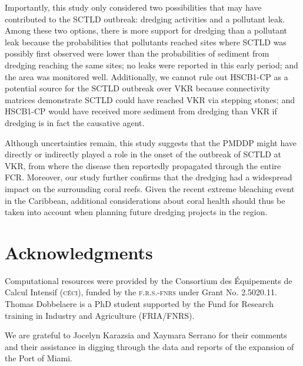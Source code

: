 \documentclass[preprint,12pt,authoryear]{elsarticle}
\begin{document}
Importantly, this study only considered two possibilities that may have contributed to the SCTLD outbreak: dredging activities and a pollutant leak. Among these two options, there is more support for dredging than a pollutant leak because the probabilities that pollutants reached sites where SCTLD was possibly first observed were lower than the probabilities of sediment from dredging reaching the same sites; no leaks were reported in this early period; and the area was monitored well. Additionally, we cannot rule out HSCB1-CP as a potential source for the SCTLD outbreak over VKR because connectivity matrices demonstrate SCTLD could have reached VKR via stepping stones; and HSCB1-CP would have received more sediment from dredging than VKR if dredging is in fact the causative agent.

Although uncertainties remain, this study suggests that the PMDDP might have directly or indirectly played a role in the onset of the outbreak of SCTLD at VKR, from where the disease then reportedly propagated through the entire FCR. Moreover, our study further confirms that the dredging had a widespread impact on the surrounding coral reefs. Given the recent extreme bleaching event in the Caribbean, additional considerations about coral health should thus be taken into account when planning future dredging projects in the region.

\section*{Acknowledgments}
Computational resources were provided by the Consortium des \'Equipements de Calcul Intensif (\textsc{c\'eci}), funded by the \textsc{f.r.s.-fnrs} under Grant No. 2.5020.11. Thomas Dobbelaere is a PhD student supported by the Fund for Research training in Industry and Agriculture (\textsc{FRIA}/\textsc{FNRS}).

We are grateful to Jocelyn Karazsia and Xaymara Serrano for their comments and their assistance in digging through the data and reports of the expansion of the Port of Miami.



\newpage
\appendix
\end{document}
